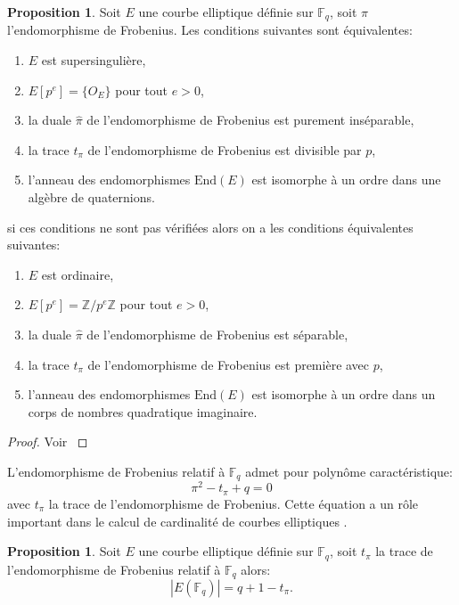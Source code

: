 \documentclass[10pt,a4paper]{book}
\theoremstyle{plain}
\theoremstyle{definition}
\theoremstyle{definition}
\theoremstyle{definition}
\newtheorem{prop}[thm]{Proposition}
\theoremstyle{definition}
\theoremstyle{remark}
\theoremstyle{remark}
\theoremstyle{definition}
\begin{document}
\begin{prop}
\label{pro:fro:dis}
Soit $E$ une courbe elliptique définie sur $\mathbb{F}_q$, soit $\pi$ l'endomorphisme de Frobenius. Les conditions suivantes sont équivalentes:
\begin{enumerate}
\item $E$ est supersingulière,
\item $E[p^e]=\{O_E\}$ pour tout $e > 0$,
\item la duale $\widehat{\pi}$ de l'endomorphisme de Frobenius est purement inséparable,
\item la trace $t_{\pi}$ de l'endomorphisme de Frobenius est divisible par $p$,
\item l'anneau des endomorphismes $\mathrm{End}(E)$ est isomorphe à un ordre dans une algèbre de quaternions.
\end{enumerate}
si ces conditions ne sont pas vérifiées alors on a les conditions équivalentes suivantes:
\begin{enumerate}
\item $E$ est ordinaire,
\item $E[p^e]=\mathbb{Z}/p^e\mathbb{Z}$ pour tout $e > 0$,
\item la duale $\widehat{\pi}$ de l'endomorphisme de Frobenius est séparable,
\item la trace $t_{\pi}$ de l'endomorphisme de Frobenius est première avec $p$,
\item l'anneau des endomorphismes $\mathrm{End}(E)$ est isomorphe à un ordre dans un corps de nombres quadratique imaginaire.
\end{enumerate}
\end{prop}

\begin{proof}
Voir \cite[Theorem V.3.1]{Silv1}
\end{proof}

L'endomorphisme de Frobenius relatif à $\mathbb{F}_q$ admet pour polynôme caractéristique:
\begin{equation}
\pi^2-t_{\pi}+q=0
\end{equation}
avec $t_{\pi}$ la trace de l'endomorphisme de Frobenius. Cette équation a un rôle important dans le calcul de cardinalité de courbes elliptiques \cite{Schoof85}.

\begin{prop}
Soit $E$ une courbe elliptique définie sur $\mathbb{F}_q$, soit $t_{\pi}$ la trace de l'endomorphisme de Frobenius relatif à $ \mathbb{F}_q$ alors:
\begin{equation*}
|E(\mathbb{F}_q)|=q+1-t_{\pi}.
\end{equation*}
\end{prop}
\end{document}
